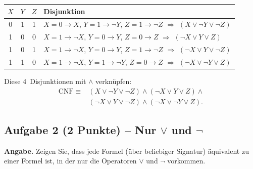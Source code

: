\documentclass[a4paper,12pt]{article}
\begin{document}
\begin{center}
\renewcommand{\arraystretch}{1.25}
\begin{tabular}{ccc|l}
\toprule
$X$ & $Y$ & $Z$ & Disjunktion \\
\midrule
0 & 1 & 1
  & $X\!=\!0 \to X$,\; $Y\!=\!1 \to \neg Y$,\;
    $Z\!=\!1 \to \neg Z$
    \;$\Rightarrow$\; $(X \vee \neg Y \vee \neg Z)$ \\
1 & 0 & 0
  & $X\!=\!1 \to \neg X$,\; $Y\!=\!0 \to Y$,\;
    $Z\!=\!0 \to Z$
    \;$\Rightarrow$\; $(\neg X \vee Y \vee Z)$ \\
1 & 0 & 1
  & $X\!=\!1 \to \neg X$,\; $Y\!=\!0 \to Y$,\;
    $Z\!=\!1 \to \neg Z$
    \;$\Rightarrow$\; $(\neg X \vee Y \vee \neg Z)$ \\
1 & 1 & 0
  & $X\!=\!1 \to \neg X$,\; $Y\!=\!1 \to \neg Y$,\;
    $Z\!=\!0 \to Z$
    \;$\Rightarrow$\; $(\neg X \vee \neg Y \vee Z)$ \\
\bottomrule
\end{tabular}
\end{center}

Diese 4~Disjunktionen mit $\wedge$ verkn\"upfen:
\begin{align*}
\text{CNF} \;\equiv\; &(X \vee \neg Y \vee \neg Z) \wedge
(\neg X \vee Y \vee Z) \wedge {} \\
& (\neg X \vee Y \vee \neg Z) \wedge
(\neg X \vee \neg Y \vee Z).
\end{align*}

\bigskip
\noindent{}

\newpage

\subsection*{Aufgabe 2 \textnormal{(2 Punkte)} -- Nur $\vee$ und $\neg$}

\textbf{Angabe.} Zeigen Sie, dass jede Formel (\"uber beliebiger
Signatur) \"aquivalent zu einer Formel ist, in der nur die Operatoren
$\vee$ und $\neg$ vorkommen.
\end{document}
